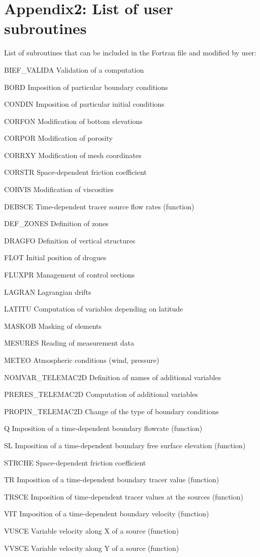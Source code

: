 
 \chapter{Appendix2: List of user subroutines}


 List of subroutines that can be included in the Fortran file and modified by user:



 BIEF\_VALIDA Validation of a computation

 BORD Imposition of particular boundary conditions

 CONDIN Imposition of particular initial conditions

 CORFON Modification of bottom elevations

 CORPOR Modification of porosity

 CORRXY Modification of mesh coordinates

 CORSTR Space-dependent friction coefficient

 CORVIS Modification of viscosities

 DEBSCE Time-dependent tracer source flow rates (function)

 DEF\_ZONES Definition of zones

 DRAGFO Definition of vertical structures

 FLOT Initial position of drogues

 FLUXPR Management of control sections

 LAGRAN Lagrangian drifts

 LATITU Computation of variables depending on latitude

 MASKOB Masking of elements

 MESURES Reading of measurement data

 METEO Atmospheric conditions (wind, pressure)

 NOMVAR\_TELEMAC2D Definition of names of additional variables

 PRERES\_TELEMAC2D Computation of additional variables

 PROPIN\_TELEMAC2D Change of the type of boundary conditions

 Q Imposition of a time-dependent boundary flowrate (function)

 SL Imposition of a time-dependent boundary free surface elevation (function)

 STRCHE Space-dependent friction coefficient

 TR Imposition of a time-dependent boundary tracer value (function)

 TRSCE Imposition of time-dependent tracer values at the sources (function)

 VIT Imposition of a time-dependent boundary velocity (function)

 VUSCE Variable velocity along X of a source (function)

 VVSCE Variable velocity along Y of a source (function)

 

